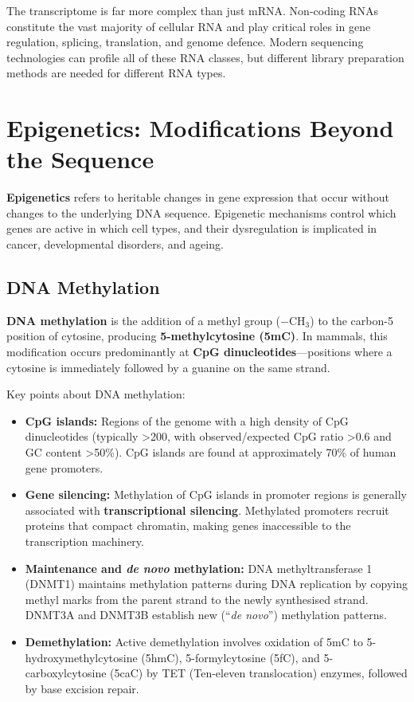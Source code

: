 \begin{keyconcept}[title={RNA Diversity}]
The transcriptome is far more complex than just mRNA. Non-coding RNAs constitute the vast majority of cellular RNA and play critical roles in gene regulation, splicing, translation, and genome defence. Modern sequencing technologies can profile all of these RNA classes, but different library preparation methods are needed for different RNA types.
\end{keyconcept}


\section{Epigenetics: Modifications Beyond the Sequence}
\label{sec:molbio:epigenetics}

\textbf{Epigenetics} refers to heritable changes in gene expression that occur without changes to the underlying DNA sequence. Epigenetic mechanisms control which genes are active in which cell types, and their dysregulation is implicated in cancer, developmental disorders, and ageing.

\subsection{DNA Methylation}
\label{subsec:molbio:dna-methylation}

\textbf{DNA methylation} is the addition of a methyl group ($-$CH$_3$) to the carbon-5 position of cytosine, producing \textbf{5-methylcytosine (5mC)}. In mammals, this modification occurs predominantly at \textbf{CpG dinucleotides}---positions where a cytosine is immediately followed by a guanine on the same strand.

Key points about DNA methylation:
\begin{itemize}[itemsep=2pt]
  \item \textbf{CpG islands:} Regions of the genome with a high density of CpG dinucleotides (typically >200\basepair{}, with observed/expected CpG ratio >0.6 and GC content >50\%). CpG islands are found at approximately 70\% of human gene promoters.
  \item \textbf{Gene silencing:} Methylation of CpG islands in promoter regions is generally associated with \textbf{transcriptional silencing}. Methylated promoters recruit proteins that compact chromatin, making genes inaccessible to the transcription machinery.
  \item \textbf{Maintenance and \textit{de novo} methylation:} DNA methyltransferase 1 (DNMT1) maintains methylation patterns during DNA replication by copying methyl marks from the parent strand to the newly synthesised strand. DNMT3A and DNMT3B establish new (``\textit{de novo}'') methylation patterns.
  \item \textbf{Demethylation:} Active demethylation involves oxidation of 5mC to 5-hydroxymethylcytosine (5hmC), 5-formylcytosine (5fC), and 5-carboxylcytosine (5caC) by TET (Ten-eleven translocation) enzymes, followed by base excision repair.
\end{itemize}

